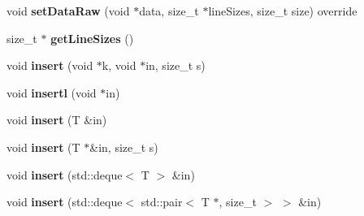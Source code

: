 \begin{DoxyCompactItemize}
\item 
\hypertarget{classfaster_1_1__workerFdd_3_01T_01_5_01_4_a4246404cbe09e51acf1f78af85e2ef13}{}void {\bfseries set\+Data\+Raw} (void $\ast$data, size\+\_\+t $\ast$line\+Sizes, size\+\_\+t size) override\label{classfaster_1_1__workerFdd_3_01T_01_5_01_4_a4246404cbe09e51acf1f78af85e2ef13}

\item 
\hypertarget{classfaster_1_1__workerFdd_3_01T_01_5_01_4_a48bef2511a5d715a3a1ccb2af7eca83c}{}size\+\_\+t $\ast$ {\bfseries get\+Line\+Sizes} ()\label{classfaster_1_1__workerFdd_3_01T_01_5_01_4_a48bef2511a5d715a3a1ccb2af7eca83c}

\item 
\hypertarget{classfaster_1_1__workerFdd_3_01T_01_5_01_4_ad0b49f344ef0a582f1cf01973832b570}{}void {\bfseries insert} (void $\ast$k, void $\ast$in, size\+\_\+t s)\label{classfaster_1_1__workerFdd_3_01T_01_5_01_4_ad0b49f344ef0a582f1cf01973832b570}

\item 
\hypertarget{classfaster_1_1__workerFdd_3_01T_01_5_01_4_aaa99e6a10c37391910d4aba2342ee618}{}void {\bfseries insertl} (void $\ast$in)\label{classfaster_1_1__workerFdd_3_01T_01_5_01_4_aaa99e6a10c37391910d4aba2342ee618}

\item 
\hypertarget{classfaster_1_1__workerFdd_3_01T_01_5_01_4_a43bf6522a9d2017c184e64f8be51698b}{}void {\bfseries insert} (T \&in)\label{classfaster_1_1__workerFdd_3_01T_01_5_01_4_a43bf6522a9d2017c184e64f8be51698b}

\item 
\hypertarget{classfaster_1_1__workerFdd_3_01T_01_5_01_4_ad3dabe7a5a99426a605e567cec8fe9d9}{}void {\bfseries insert} (T $\ast$\&in, size\+\_\+t s)\label{classfaster_1_1__workerFdd_3_01T_01_5_01_4_ad3dabe7a5a99426a605e567cec8fe9d9}

\item 
\hypertarget{classfaster_1_1__workerFdd_3_01T_01_5_01_4_a29976297df6221272c98ed2b83545775}{}void {\bfseries insert} (std\+::deque$<$ T $>$ \&in)\label{classfaster_1_1__workerFdd_3_01T_01_5_01_4_a29976297df6221272c98ed2b83545775}

\item 
\hypertarget{classfaster_1_1__workerFdd_3_01T_01_5_01_4_aa3fde5f3b38bb5e905f8d668526a0ede}{}void {\bfseries insert} (std\+::deque$<$ std\+::pair$<$ T $\ast$, size\+\_\+t $>$ $>$ \&in)\label{classfaster_1_1__workerFdd_3_01T_01_5_01_4_aa3fde5f3b38bb5e905f8d668526a0ede}


\end{DoxyCompactItemize}
